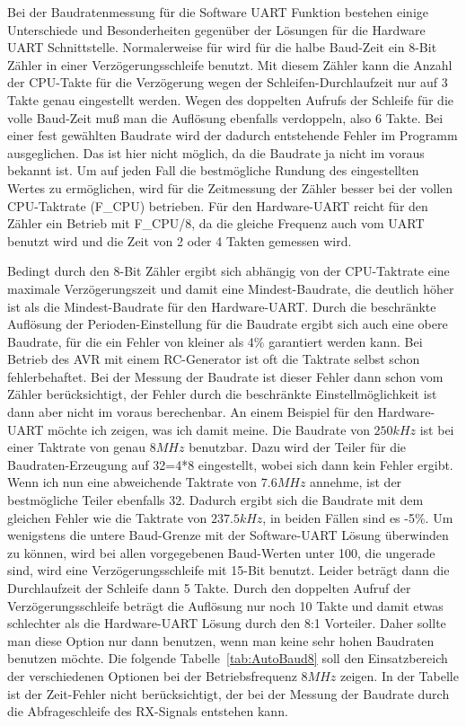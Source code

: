 Bei der Baudratenmessung für die Software UART Funktion bestehen einige Unterschiede
und Besonderheiten gegenüber der Lösungen für die Hardware UART Schnittstelle.
Normalerweise  für wird für die halbe Baud-Zeit ein 8-Bit Zähler in einer
Verzögerungsschleife benutzt. Mit diesem Zähler kann die Anzahl der CPU-Takte für die
Verzögerung wegen der Schleifen-Durchlaufzeit nur auf 3 Takte genau eingestellt werden. 
Wegen des doppelten Aufrufs der Schleife für die volle Baud-Zeit muß man 
die Auflösung ebenfalls verdoppeln, also 6 Takte. Bei einer fest gewählten
Baudrate wird der dadurch entstehende Fehler im Programm ausgeglichen. 
Das ist hier nicht möglich, da die Baudrate ja nicht im voraus bekannt ist.
Um auf jeden Fall die bestmögliche Rundung des eingestellten Wertes zu ermöglichen,
wird für die Zeitmessung der Zähler besser bei der vollen CPU-Taktrate (F\_CPU) betrieben.
Für den Hardware-UART reicht für den Zähler ein Betrieb mit F\_CPU/8, 
da die gleiche Frequenz auch vom UART benutzt wird und die Zeit von
2 oder 4 Takten gemessen wird.

Bedingt durch den 8-Bit Zähler ergibt sich abhängig von der CPU-Taktrate
eine maximale Verzögerungszeit und damit eine Mindest-Baudrate, die
deutlich höher ist als die Mindest-Baudrate für den Hardware-UART.
Durch die beschränkte Auflösung der Perioden-Einstellung für
die Baudrate ergibt sich auch eine obere Baudrate, für die ein Fehler von 
kleiner als 4\% garantiert werden kann.
Bei Betrieb des AVR mit einem RC-Generator ist oft die Taktrate selbst schon
fehlerbehaftet. Bei der Messung der Baudrate ist dieser Fehler dann
schon vom Zähler berücksichtigt, der Fehler durch die beschränkte Einstellmöglichkeit
ist dann aber nicht im voraus berechenbar.
An einem Beispiel für den Hardware-UART  möchte ich zeigen, was ich damit meine.
Die Baudrate von \(250kHz\) ist bei einer Taktrate von genau \(8MHz\) benutzbar.
Dazu wird der Teiler für die Baudraten-Erzeugung auf 32=4*8 eingestellt, wobei sich 
dann kein Fehler ergibt.
Wenn ich nun eine abweichende Taktrate von \(7.6MHz\) annehme, ist
der bestmögliche Teiler ebenfalls 32. Dadurch ergibt sich die Baudrate mit
dem gleichen Fehler wie die Taktrate von \(237.5kHz\), in beiden Fällen sind es -5\%.
Um wenigstens die untere Baud-Grenze mit der Software-UART Lösung überwinden
zu können, wird bei allen vorgegebenen Baud-Werten unter 100, die ungerade sind,
wird eine Verzögerungsschleife mit 15-Bit benutzt. Leider beträgt dann die Durchlaufzeit
der Schleife dann 5 Takte. Durch den doppelten Aufruf der Verzögerungsschleife beträgt
die Auflösung nur noch 10 Takte und damit etwas schlechter als die Hardware-UART
Lösung durch den 8:1 Vorteiler.
Daher sollte man diese Option nur dann benutzen, wenn man keine sehr hohen Baudraten benutzen möchte.
Die folgende Tabelle~\ref{tab:AutoBaud8} soll den Einsatzbereich der verschiedenen Optionen
bei der Betriebsfrequenz \(8MHz\) zeigen.
In der Tabelle ist der Zeit-Fehler nicht berücksichtigt, der bei der Messung der Baudrate
durch die Abfrageschleife des RX-Signals entstehen kann.

